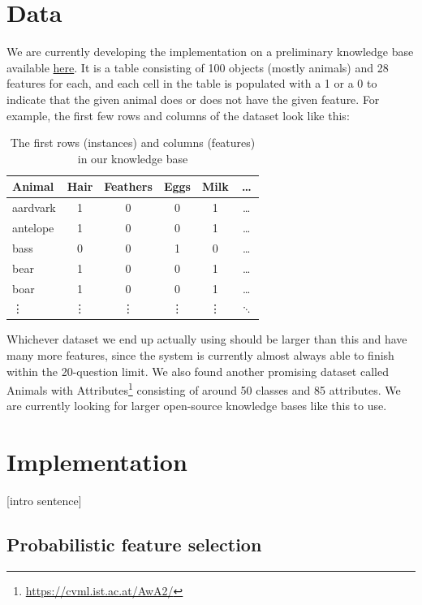 \documentclass[11pt,a4paper]{article}
\begin{document}
\section{Data}
We are currently developing the implementation on a preliminary knowledge base available \href{https://github.com/drdevinhopkins/20_Questions/blob/master/knowledge_base.csv}{here}.
It is a table consisting of 100 objects (mostly animals) and 28 features for each, and each cell in the table is populated with a 1 or a 0 to indicate that the given animal does or does not have the given feature.
For example, the first few rows and columns of the dataset look like this:

\begin{table}
\begin{center}
	\begin{tabular}{lccccc}
		\toprule
		Animal & Hair & Feathers & Eggs & Milk & \ldots \\ \midrule
		aardvark & 1 & 0 & 0 & 1 & \ldots \\
		antelope & 1 & 0 & 0 & 1 & \ldots \\
		bass & 0 & 0 & 1 & 0 & \ldots \\
		bear & 1 & 0 & 0 & 1 & \ldots \\
		boar & 1 & 0 & 0 & 1 & \ldots \\
		\vdots & \vdots & \vdots & \vdots & \vdots & $\ddots$ \\
		\bottomrule
	\end{tabular}
\end{center}
\caption{The first rows (instances) and columns (features) in our knowledge base}
\label{tab:knowledge-base}
\end{table}

Whichever dataset we end up actually using should be larger than this and have many more features, since the system is currently almost always able to finish within the 20-question limit.
We also found another promising dataset called Animals with Attributes\footnote{\url{https://cvml.ist.ac.at/AwA2/}} consisting of around 50 classes and 85 attributes. 
We are currently looking for larger open-source knowledge bases like this to use.

\section{Implementation}

[intro sentence]

\subsection{Probabilistic feature selection}
\end{document}
